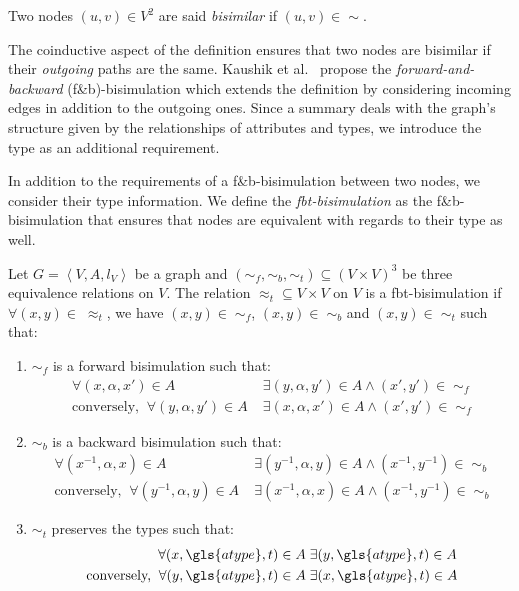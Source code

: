\begin{remark}
Two nodes $(u, v) \in V^2$ are said \emph{bisimilar} if $(u, v) \in \sim$.
\end{remark}

The coinductive aspect of the definition ensures that two nodes are bisimilar if their \emph{outgoing} paths are the same. Kaushik et al.~\cite{kaushik:2002:cib} propose the \emph{forward-and-backward} (f\&b)-bisimulation which extends the definition by considering incoming edges in addition to the outgoing ones. Since a summary deals with the graph's structure given by the relationships of attributes and types, we introduce the type as an additional requirement.

In addition to the requirements of a f\&b-bisimulation between two nodes, we consider their type information. We define the \emph{fbt-bisimulation} as the f\&b-bisimulation that ensures that nodes are equivalent with regards to their type as well.

\begin{definition}
Let $G=\left\langle V, A, l_V \right\rangle$ be a graph and $(\sim_f, \sim_b, \sim_t) \subseteq (V \times V)^3$ be three equivalence relations on $V$.
The relation $\approx_t \subseteq V \times V$ on $V$ is a fbt-bisimulation if $\forall (x,y) \in\; \approx_t$, we have $(x,y) \in\; \sim_f$, $(x,y) \in\; \sim_b$ and $(x,y) \in\; \sim_t$ such that:
\begin{enumerate}
\item $\sim_f$ is a forward bisimulation such that:
$$
\begin{aligned}
\forall (x, \alpha, x') \in A&\; \exists (y, \alpha, y') \in A \wedge (x',y') \in\; \sim_f \\
\text{conversely,}\;\; \forall (y, \alpha, y') \in A&\; \exists (x, \alpha, x') \in A \wedge (x',y') \in\; \sim_f
\end{aligned}
$$

\item $\sim_b$ is a backward bisimulation such that:
$$
\begin{aligned}
\forall (x^{-1}, \alpha, x) \in A&\; \exists (y^{-1}, \alpha, y) \in A \wedge (x^{-1}, y^{-1}) \in\; \sim_b \\
\text{conversely,}\;\; \forall (y^{-1}, \alpha, y) \in A&\; \exists (x^{-1}, \alpha, x) \in A \wedge (x^{-1}, y^{-1}) \in\; \sim_b
\end{aligned}
$$

\item $\sim_t$ preserves the types such that:
$$
\begin{aligned}
\forall (x, \gls{atype}, t) \in A&\; \exists (y, \gls{atype}, t) \in A \\
\text{conversely,}\;\; \forall (y, \gls{atype}, t) \in A&\; \exists (x, \gls{atype}, t) \in A
\end{aligned}
$$

\end{enumerate}
\end{definition}

